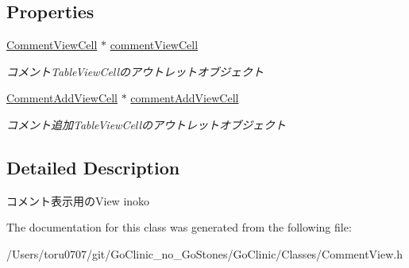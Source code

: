 \subsection*{Properties}
\begin{DoxyCompactItemize}
\item 
\hypertarget{interface_comment_view_a25f1aae9854f5aec5080757b9b673153}{
\hyperlink{interface_comment_view_cell}{CommentViewCell} $\ast$ \hyperlink{interface_comment_view_a25f1aae9854f5aec5080757b9b673153}{commentViewCell}}
\label{interface_comment_view_a25f1aae9854f5aec5080757b9b673153}

\begin{DoxyCompactList}\small\item\em コメントTableViewCellのアウトレットオブジェクト \end{DoxyCompactList}\item 
\hypertarget{interface_comment_view_a072d5a87b8400c59de61d90db68024a7}{
\hyperlink{interface_comment_add_view_cell}{CommentAddViewCell} $\ast$ \hyperlink{interface_comment_view_a072d5a87b8400c59de61d90db68024a7}{commentAddViewCell}}
\label{interface_comment_view_a072d5a87b8400c59de61d90db68024a7}

\begin{DoxyCompactList}\small\item\em コメント追加TableViewCellのアウトレットオブジェクト \end{DoxyCompactList}\end{DoxyCompactItemize}


\subsection{Detailed Description}
コメント表示用のView  inoko 

The documentation for this class was generated from the following file:\begin{DoxyCompactItemize}
\item 
/Users/toru0707/git/GoClinic\_\-no\_\-GoStones/GoClinic/Classes/CommentView.h\end{DoxyCompactItemize}
